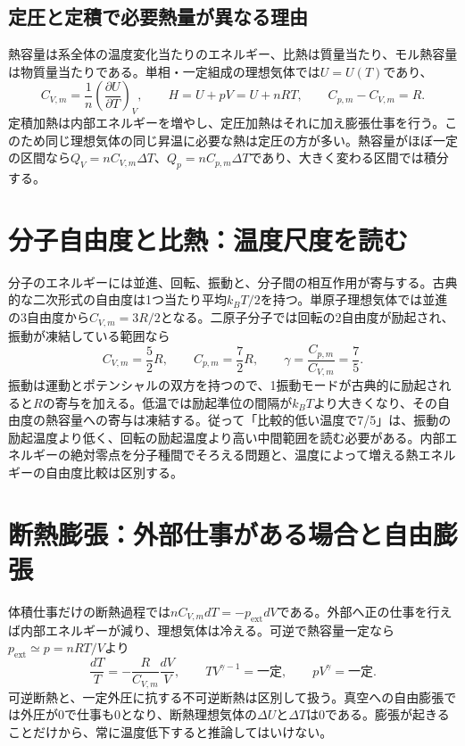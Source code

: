 \subsection{定圧と定積で必要熱量が異なる理由}
\label{theory:thermo:capacity}
熱容量は系全体の温度変化当たりのエネルギー、比熱は質量当たり、モル熱容量は物質量当たりである。単相・一定組成の理想気体では$U=U(T)$であり、
\[
 C_{V,m}=\frac1n\left(\frac{\partial U}{\partial T}\right)_V,
 \qquad H=U+pV=U+nRT,
 \qquad C_{p,m}-C_{V,m}=R.
\]
定積加熱は内部エネルギーを増やし、定圧加熱はそれに加え膨張仕事を行う。このため同じ理想気体の同じ昇温に必要な熱は定圧の方が多い。熱容量がほぼ一定の区間なら$Q_V=nC_{V,m}\Delta T$、$Q_p=nC_{p,m}\Delta T$であり、大きく変わる区間では積分する。

\section{分子自由度と比熱：温度尺度を読む}
\label{theory:thermo:degrees}
分子のエネルギーには並進、回転、振動と、分子間の相互作用が寄与する。古典的な二次形式の自由度は1つ当たり平均$k_BT/2$を持つ。単原子理想気体では並進の3自由度から$C_{V,m}=3R/2$となる。二原子分子では回転の2自由度が励起され、振動が凍結している範囲なら
\[
 C_{V,m}=\frac52R,\qquad C_{p,m}=\frac72R,
 \qquad \gamma=\frac{C_{p,m}}{C_{V,m}}=\frac75.
\]
振動は運動とポテンシャルの双方を持つので、1振動モードが古典的に励起されると$R$の寄与を加える。低温では励起準位の間隔が$k_BT$より大きくなり、その自由度の熱容量への寄与は凍結する。従って「比較的低い温度で7/5」は、振動の励起温度より低く、回転の励起温度より高い中間範囲を読む必要がある。内部エネルギーの絶対零点を分子種間でそろえる問題と、温度によって増える熱エネルギーの自由度比較は区別する。

\section{断熱膨張：外部仕事がある場合と自由膨張}
\label{theory:thermo:adiabatic}
体積仕事だけの断熱過程では$nC_{V,m}dT=-p_{\mathrm{ext}}dV$である。外部へ正の仕事を行えば内部エネルギーが減り、理想気体は冷える。可逆で熱容量一定なら$p_{\mathrm{ext}}\simeq p=nRT/V$より
\[
 \frac{dT}{T}=-\frac{R}{C_{V,m}}\frac{dV}{V},
 \qquad TV^{\gamma-1}=\text{一定},\qquad pV^\gamma=\text{一定}.
\]
可逆断熱と、一定外圧に抗する不可逆断熱は区別して扱う\parencite{mit_thermo_adiabatic2008}。真空への自由膨張では外圧が0で仕事も0となり、断熱理想気体の$\Delta U$と$\Delta T$は0である。膨張が起きることだけから、常に温度低下すると推論してはいけない。

